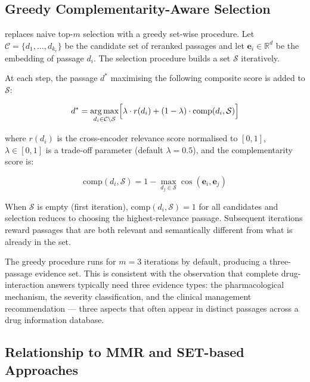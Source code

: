\subsection{Greedy Complementarity-Aware Selection}

\rarerag{} replaces naive top-$m$ selection with a greedy set-wise procedure.
Let $\mathcal{C} = \{d_1, \ldots, d_{k_r}\}$ be the candidate set of reranked
passages and let $\mathbf{e}_i \in \mathbb{R}^d$ be the embedding of
passage $d_i$.
The selection procedure builds a set $\mathcal{S}$ iteratively.

At each step, the passage $d^*$ maximising the following composite score is
added to $\mathcal{S}$:

\begin{equation}
  d^* = \operatorname*{arg\,max}_{d_i \in \mathcal{C} \setminus \mathcal{S}}
        \Bigl[
          \lambda \cdot r(d_i)
          + (1 - \lambda) \cdot \mathrm{comp}(d_i, \mathcal{S})
        \Bigr]
  \label{eq:setwise}
\end{equation}

where $r(d_i)$ is the cross-encoder relevance score normalised to $[0,1]$,
$\lambda \in [0,1]$ is a trade-off parameter (default $\lambda = 0.5$),
and the complementarity score is:

\begin{equation}
  \mathrm{comp}(d_i, \mathcal{S})
    = 1 - \max_{d_j \in \mathcal{S}} \cos(\mathbf{e}_i, \mathbf{e}_j)
  \label{eq:comp}
\end{equation}

When $\mathcal{S}$ is empty (first iteration),
$\mathrm{comp}(d_i, \mathcal{S}) = 1$ for all candidates and selection
reduces to choosing the highest-relevance passage.
Subsequent iterations reward passages that are both relevant and semantically
different from what is already in the set.

The greedy procedure runs for $m = 3$ iterations by default, producing a
three-passage evidence set.
This is consistent with the observation that complete drug-interaction answers
typically need three evidence types: the pharmacological mechanism, the
severity classification, and the clinical management recommendation ---
three aspects that often appear in distinct passages across a drug information
database.

\subsection{Relationship to MMR and SET-based Approaches}

